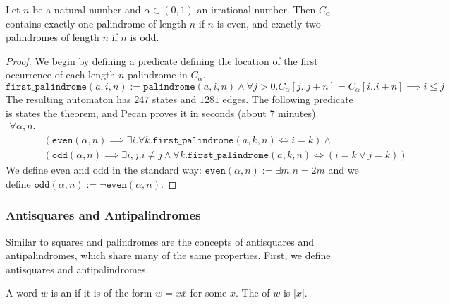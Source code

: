 \begin{theorem}
    Let $n$ be a natural number and $\alpha \in (0, 1)$ an irrational number.
    Then $C_{\alpha}$ contains exactly one palindrome of length $n$ if $n$ is even, and exactly two palindromes of length $n$ if $n$ is odd.
\end{theorem}
\begin{proof}
    We begin by defining a predicate defining the location of the first occurrence of each length $n$ palindrome in $C_{\alpha}$.
    \[
        \texttt{first\_palindrome}(a,i,n) :=
            \texttt{palindrome}(a,i,n)
            \land
            \forall j > 0. C_{\alpha}[j..j+n] = C_{\alpha}[i..i+n] \implies i \leq j
    \]
    The resulting automaton has $247$ states and $1281$ edges.
    The following predicate is states the theorem, and Pecan proves it in  seconds (about 7 minutes).
    \begin{align*}
        \forall \alpha, n. & \\
            & (\texttt{even}(\alpha, n) \implies \exists i. \forall k. \texttt{first\_palindrome}(a,k,n) \iff i = k) \land \\
            & (\texttt{odd}(\alpha, n) \implies \exists i,j. i \neq j \land \forall k. \texttt{first\_palindrome}(a,k,n) \iff (i = k \lor j = k))
    \end{align*}
    We define even and odd in the standard way: $\texttt{even}(\alpha, n) := \exists m. n = 2m$ and we define $\texttt{odd}(\alpha, n) := \lnot \texttt{even}(\alpha, n)$.
\end{proof}


\subsubsection{Antisquares and Antipalindromes}

Similar to squares and palindromes are the concepts of antisquares and antipalindromes, which share many of the same properties.
First, we define antisquares and antipalindromes.

\begin{definition}
    A word $w$ is an  if it is of the form $w = x \overline{x}$ for some $x$.
    The  of $w$ is $|x|$.
\end{definition}

